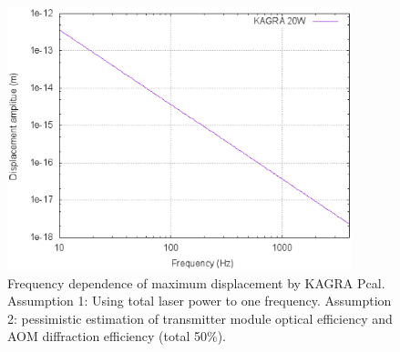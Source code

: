 \begin{figure}
\begin{center}
\includegraphics[width=10cm]{Figures/pcal_disp.eps}
\caption{Frequency dependence of maximum displacement by KAGRA Pcal. 
Assumption 1: Using total laser power to one frequency.
Assumption 2: pessimistic estimation of transmitter module optical efficiency and 
AOM diffraction efficiency (total 50$\%$). }
\label{fig:kagra_pcal_displacement} 
\end{center}
\end{figure}


 

